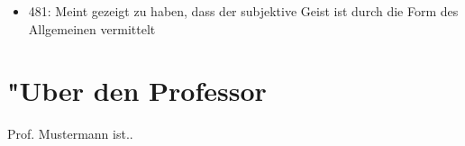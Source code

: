 \documentclass[emulatestandardclasses]{scrartcl}
\begin{document}
\begin{itemize}
  \item 481: Meint gezeigt zu haben, dass der subjektive Geist ist durch die Form des Allgemeinen vermittelt
\end{itemize}


\newpage
\section{"Uber den Professor}
Prof. Mustermann ist..


\end{document}
